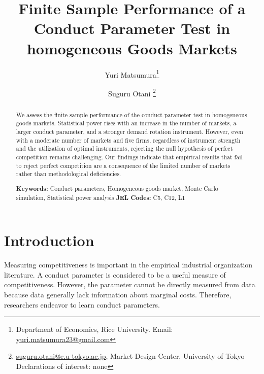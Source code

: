\documentclass[11pt, a4paper]{article}
\title{Finite Sample Performance of a Conduct Parameter Test in homogeneous Goods Markets}
\author{Yuri Matsumura\thanks{Department of Economics, Rice University. Email: \href{mailto:}{yuri.matsumura23@gmail.com}} \and Suguru Otani \thanks{\href{mailto:}{suguru.otani@e.u-tokyo.ac.jp}, Market Design Center, University of Tokyo\\
Declarations of interest: none %
}}
\begin{document}
\maketitle
\begin{abstract}
    We assess the finite sample performance of the conduct parameter test in homogeneous goods markets. Statistical power rises with an increase in the number of markets, a larger conduct parameter, and a stronger demand rotation instrument. However, even with a moderate number of markets and five firms, regardless of instrument strength and the utilization of optimal instruments, rejecting the null hypothesis of perfect competition remains challenging. Our findings indicate that empirical results that fail to reject perfect competition are a consequence of the limited number of markets rather than methodological deficiencies.
\vspace{0.1in}

\noindent\textbf{Keywords:} Conduct parameters, Homogeneous goods market, Monte Carlo simulation, Statistical power analysis
\vspace{0in}
\newline
\noindent\textbf{JEL Codes:} C5, C12, L1

\bigskip
\end{abstract}


\section{Introduction}
Measuring competitiveness is important in the empirical industrial organization literature.
A conduct parameter is considered to be a useful measure of competitiveness. 
However, the parameter cannot be directly measured from data because data generally lack information about marginal costs.
Therefore, researchers endeavor to learn conduct parameters.
\end{document}
